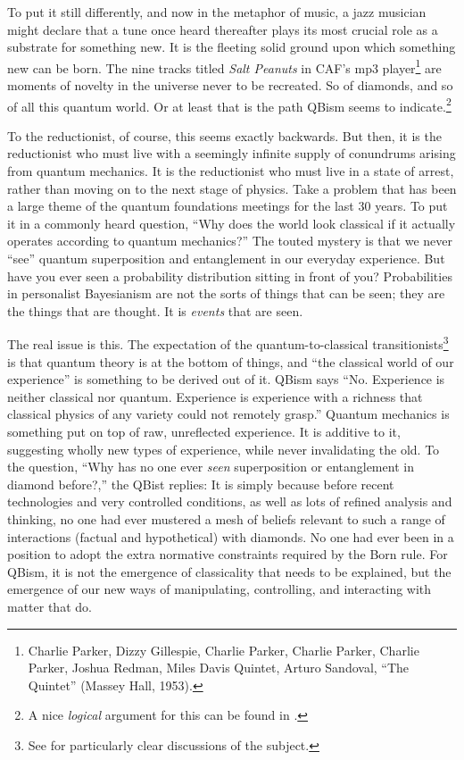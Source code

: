 \documentclass[aps,pra,superscriptaddress,12pt,tightenlines,nofootinbib]{revtex4-2}
\begin{document}
To put it still differently, and now in the metaphor of music, a jazz musician might declare that a tune once heard thereafter plays its most crucial role as a substrate for something new. It is the fleeting solid ground upon which something new can be born.  The nine tracks titled {\sl Salt Peanuts\/} in CAF's mp3 player\footnote{Charlie Parker, Dizzy Gillespie, Charlie Parker, Charlie Parker, Charlie Parker, Joshua Redman, Miles Davis Quintet, Arturo Sandoval, ``The Quintet'' (Massey Hall, 1953).} are moments of novelty in the universe never to be recreated.  So of diamonds, and so of all this quantum world.  Or at least that is the path QBism seems to indicate.\footnote{A nice {\it logical\/} argument for this can be found in \cite{Ojima92}.}

To the reductionist, of course, this seems exactly backwards.  But then, it is the reductionist who must live with a seemingly infinite supply of conundrums arising from quantum mechanics.  It is the reductionist who must live in a state of arrest, rather than moving on to the next stage of physics.  Take a problem that has been a large theme of the quantum foundations meetings for the last 30 years.  To put it in a commonly heard question, ``Why does the world look classical if it actually operates according to quantum mechanics?''  The touted mystery is that we never ``see'' quantum superposition and entanglement in our everyday experience.  But have you ever seen a probability distribution sitting in front of you?  Probabilities in personalist Bayes\-ian\-ism are not the sorts of things that can be seen; they are the things that are thought.  It is {\it events\/} that are seen.

The real issue is this.  The expectation of the quantum-to-classical transitionists\footnote{See \cite{Schlosshauer07,Schlosshauer08} for particularly clear discussions of the subject.} is that quantum theory is at the bottom of things, and ``the classical world of our experience'' is something to be derived out of it.  QBism says ``No.  Experience is neither classical nor quan\-tum.  Experience is experience with a richness that classical physics of any variety could not remotely grasp.''  Quantum mechanics is something put on top of raw, unreflected experience.  It is additive to it, suggesting wholly new types of experience, while never invalidating the old.  To the question, ``Why has no one ever {\it seen\/} superposition or entanglement in diamond before?,'' the QBist replies:  It is simply because before recent technologies and very controlled conditions, as well as lots of refined analysis and thinking, no one had ever mustered a mesh of beliefs relevant to such a range of interactions (factual and hypothetical) with diamonds.  No one had ever been in a position to adopt the extra normative constraints required by the Born rule.  For QBism, it is not the emergence of classicality that needs to be explained, but the emergence of our new ways of manipulating, controlling, and interacting with matter that do.
\end{document}
